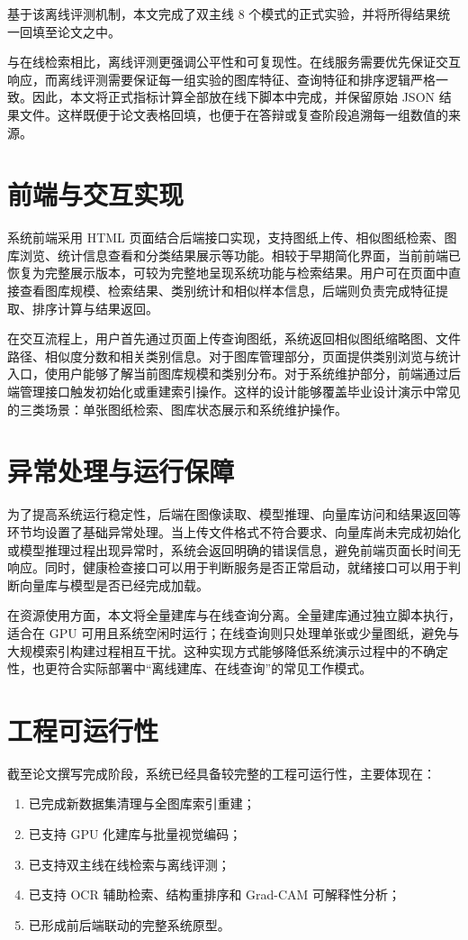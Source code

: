 基于该离线评测机制，本文完成了双主线 8 个模式的正式实验，并将所得结果统一回填至论文之中。

与在线检索相比，离线评测更强调公平性和可复现性。在线服务需要优先保证交互响应，而离线评测需要保证每一组实验的图库特征、查询特征和排序逻辑严格一致。因此，本文将正式指标计算全部放在线下脚本中完成，并保留原始 JSON 结果文件。这样既便于论文表格回填，也便于在答辩或复查阶段追溯每一组数值的来源。

\section{前端与交互实现}

系统前端采用 HTML 页面结合后端接口实现，支持图纸上传、相似图纸检索、图库浏览、统计信息查看和分类结果展示等功能。相较于早期简化界面，当前前端已恢复为完整展示版本，可较为完整地呈现系统功能与检索结果。用户可在页面中直接查看图库规模、检索结果、类别统计和相似样本信息，后端则负责完成特征提取、排序计算与结果返回。

在交互流程上，用户首先通过页面上传查询图纸，系统返回相似图纸缩略图、文件路径、相似度分数和相关类别信息。对于图库管理部分，页面提供类别浏览与统计入口，使用户能够了解当前图库规模和类别分布。对于系统维护部分，前端通过后端管理接口触发初始化或重建索引操作。这样的设计能够覆盖毕业设计演示中常见的三类场景：单张图纸检索、图库状态展示和系统维护操作。

\section{异常处理与运行保障}

为了提高系统运行稳定性，后端在图像读取、模型推理、向量库访问和结果返回等环节均设置了基础异常处理。当上传文件格式不符合要求、向量库尚未完成初始化或模型推理过程出现异常时，系统会返回明确的错误信息，避免前端页面长时间无响应。同时，健康检查接口可以用于判断服务是否正常启动，就绪接口可以用于判断向量库与模型是否已经完成加载。

在资源使用方面，本文将全量建库与在线查询分离。全量建库通过独立脚本执行，适合在 GPU 可用且系统空闲时运行；在线查询则只处理单张或少量图纸，避免与大规模索引构建过程相互干扰。这种实现方式能够降低系统演示过程中的不确定性，也更符合实际部署中“离线建库、在线查询”的常见工作模式。

\section{工程可运行性}

截至论文撰写完成阶段，系统已经具备较完整的工程可运行性，主要体现在：
\begin{enumerate}
  \item 已完成新数据集清理与全图库索引重建；
  \item 已支持 GPU 化建库与批量视觉编码；
  \item 已支持双主线在线检索与离线评测；
  \item 已支持 OCR 辅助检索、结构重排序和 Grad-CAM 可解释性分析；
  \item 已形成前后端联动的完整系统原型。
\end{enumerate}

